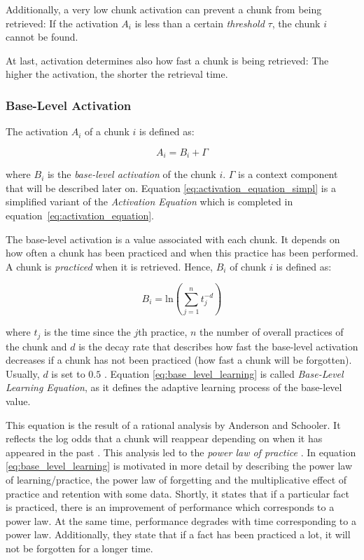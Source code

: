 Additionally, a very low chunk activation can prevent a chunk from being retrieved: If the activation $A_i$ is less than a certain \emph{threshold} $\tau$, the chunk $i$ cannot be found.

At last, activation determines also how fast a chunk is being retrieved: The higher the activation, the shorter the retrieval time.

\subsubsection{Base-Level Activation}
\label{base_level_activation}

The activation $A_i$ of a chunk $i$ is defined as:

\begin{equation}
 \label{eq:activation_equation_simpl}
 A_i = B_i + \Gamma
\end{equation}

where $B_i$ is the \emph{base-level activation} of the chunk $i$. $\Gamma$ is a context component that will be described later on. Equation \eqref{eq:activation_equation_simpl} is a simplified variant of the \emph{Activation Equation} which is completed in equation~\eqref{eq:activation_equation}.

The base-level activation is a value associated with each chunk. It depends on how often a chunk has been practiced and when this practice has been performed. A chunk is \emph{practiced} when it is retrieved. Hence, $B_i$ of chunk $i$ is defined as:

\begin{equation}
\label{eq:base_level_learning}
B_i = \mathrm{ln}\left(\sum_{j=1}^n{t_j^{-d}}\right)
\end{equation}

where $t_j$ is the time since the $j$th practice, $n$ the number of overall practices of the chunk and $d$ is the decay rate that describes how fast the base-level activation decreases if a chunk has not been practiced (how fast a chunk will be forgotten). Usually, $d$ is set to $0.5$ \cite[p. 1042]{anderson_integrated_2004}. Equation \eqref{eq:base_level_learning} is called \emph{Base-Level Learning Equation}, as it defines the adaptive learning process of the base-level value.

This equation is the result of a rational analysis by Anderson and Schooler. It reflects the log odds that a chunk will reappear depending on when it has appeared in the past \cite[33]{taatgen_modeling_2006}. This analysis led to the \emph{power law of practice} \cite[1042]{anderson_integrated_2004}. In \cite[8--11]{anderson_implications_2000} equation \eqref{eq:base_level_learning} is motivated in more detail by describing the power law of learning/practice, the power law of forgetting and the multiplicative effect of practice and retention with some data. Shortly, it states that if a particular fact is practiced, there is an improvement of performance which corresponds to a power law. At the same time, performance degrades with time corresponding to a power law. Additionally, they state that if a fact has been practiced a lot, it will not be forgotten for a longer time.

